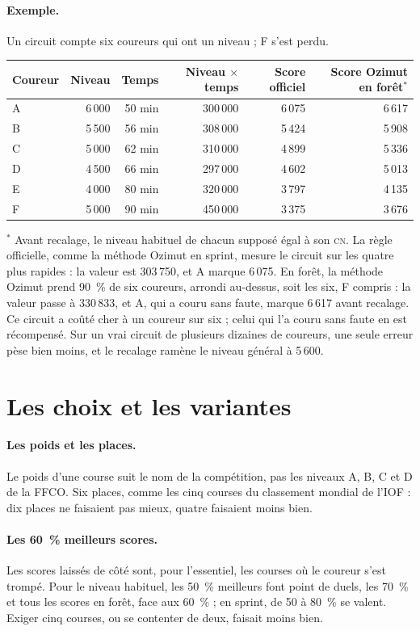 \documentclass[11pt,a4paper]{article}
\newcommand{\CN}{\textsc{cn}}
\begin{document}
\paragraph{Exemple.} Un circuit compte six coureurs qui ont un niveau ; F s'est perdu.
\begin{center}\small
\begin{tabular}{@{}lrrrrr@{}}\toprule
Coureur & Niveau & Temps & Niveau $\times$ temps & Score officiel & Score Ozimut en forêt$^*$ \\ \midrule
A & 6\,000 & 50 min & 300\,000 & 6\,075 & 6\,617 \\
B & 5\,500 & 56 min & 308\,000 & 5\,424 & 5\,908 \\
C & 5\,000 & 62 min & 310\,000 & 4\,899 & 5\,336 \\
D & 4\,500 & 66 min & 297\,000 & 4\,602 & 5\,013 \\
E & 4\,000 & 80 min & 320\,000 & 3\,797 & 4\,135 \\
F & 5\,000 & 90 min & 450\,000 & 3\,375 & 3\,676 \\ \bottomrule
\end{tabular}
\end{center}
$^*$ Avant recalage, le niveau habituel de chacun supposé égal à son \CN. La règle officielle, comme la méthode Ozimut en sprint, mesure le circuit sur les quatre plus rapides : la valeur est 303\,750, et A marque 6\,075. En forêt, la méthode Ozimut prend 90~\% de six coureurs, arrondi au-dessus, soit les six, F compris : la valeur passe à 330\,833, et A, qui a couru sans faute, marque 6\,617 avant recalage. Ce circuit a coûté cher à un coureur sur six ; celui qui l'a couru sans faute en est récompensé. Sur un vrai circuit de plusieurs dizaines de coureurs, une seule erreur pèse bien moins, et le recalage ramène le niveau général à 5\,600.

\section{Les choix et les variantes}

\paragraph{Les poids et les places.} Le poids d'une course suit le nom de la compétition, pas les niveaux A, B, C et D de la FFCO. Six places, comme les cinq courses du classement mondial de l'IOF : dix places ne faisaient pas mieux, quatre faisaient moins bien.

\paragraph{Les 60~\% meilleurs scores.} Les scores laissés de côté sont, pour l'essentiel, les courses où le coureur s'est trompé. Pour le niveau habituel, les 50~\% meilleurs font \NeligFifty{} point de duels, les 70~\% \NeligSeventy{} et tous les scores \NeligAll{} en forêt, face aux 60~\% ; en sprint, de 50 à 80~\% se valent. Exiger cinq courses, ou se contenter de deux, faisait moins bien.
\end{document}

